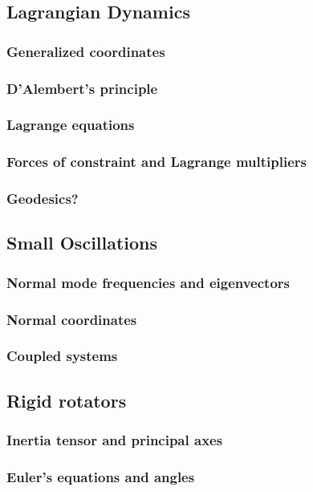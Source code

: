 \documentclass[]{article}
\begin{document}
\subsection{Lagrangian Dynamics}
\subsubsection{Generalized coordinates}
\subsubsection{D'Alembert's principle}
\subsubsection{Lagrange equations}
\subsubsection{Forces of constraint and Lagrange multipliers}
\subsubsection{Geodesics?}

\subsection{Small Oscillations}
\subsubsection{Normal mode frequencies and eigenvectors}
\subsubsection{Normal coordinates}
\subsubsection{Coupled systems}

\subsection{Rigid rotators}
\subsubsection{Inertia tensor and principal axes}
\subsubsection{Euler's equations and angles}
\end{document}
